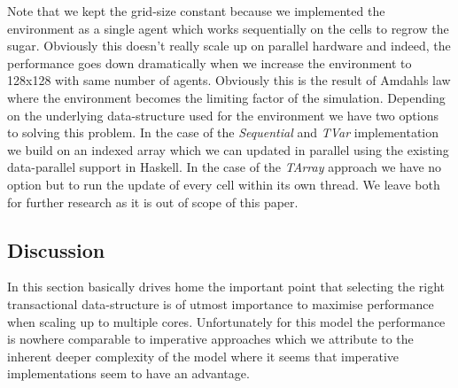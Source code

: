 Note that we kept the grid-size constant because we implemented the environment as a single agent which works sequentially on the cells to regrow the sugar. Obviously this doesn't really scale up on parallel hardware and indeed, the performance goes down dramatically when we increase the environment to 128x128 with same number of agents. Obviously this is the result of Amdahls law where the environment becomes the limiting factor of the simulation. Depending on the underlying data-structure used for the environment we have two options to solving this problem. In the case of the \textit{Sequential} and \textit{TVar} implementation we build on an indexed array which we can updated in parallel using the existing data-parallel support in Haskell. In the case of the \textit{TArray} approach we have no option but to run the update of every cell within its own thread. We leave both for further research as it is out of scope of this paper. 

\subsection{Discussion}
In this section basically drives home the important point that selecting the right transactional data-structure is of utmost importance to maximise performance when scaling up to multiple cores. Unfortunately for this model the performance is nowhere comparable to imperative approaches which we attribute to the inherent deeper complexity of the model where it seems that imperative implementations seem to have an advantage.


